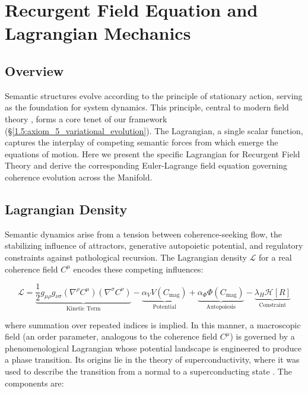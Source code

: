 \chapter{Recurgent Field Equation and Lagrangian Mechanics}
\label{6:recurgent_field_equation_and_lagrangian_mechanics}


\section{Overview}
\label{6.1:overview}

Semantic structures evolve according to the principle of stationary action, serving as the foundation for system dynamics. This principle, central to modern field theory \autocite{GoldsteinPooleSafko2002, Arnold1989}, forms a core tenet of our framework (\S\ref{1.5:axiom_5_variational_evolution}). The Lagrangian, a single scalar function, captures the interplay of competing semantic forces from which emerge the equations of motion. Here we present the specific Lagrangian for Recurgent Field Theory and derive the corresponding Euler-Lagrange field equation governing coherence evolution across the Manifold.


\section{Lagrangian Density}
\label{6.2:lagrangian_density}

Semantic dynamics arise from a tension between coherence-seeking flow, the stabilizing influence of attractors, generative autopoietic potential, and regulatory constraints against pathological recursion. The Lagrangian density \(\mathcal{L}\) for a real coherence field \(C^\mu\) encodes these competing influences:

\begin{equation}
\mathcal{L} = \underbrace{\frac{1}{2} g_{\mu\rho} g_{\nu\sigma} (\nabla^\rho C^\mu)(\nabla^\sigma C^\nu)}_{\text{Kinetic Term}} - \underbrace{\alpha_V V(C_{\text{mag}})}_{\text{Potential}} + \underbrace{\alpha_\Phi \Phi(C_{\text{mag}})}_{\text{Autopoiesis}} - \underbrace{\lambda_H \mathcal{H}[R]}_{\text{Constraint}}
\end{equation}

where summation over repeated indices is implied. In this manner, a macroscopic field (an order parameter, analogous to the coherence field \(C^\mu\)) is governed by a phenomenological Lagrangian whose potential landscape is engineered to produce a phase transition. Its origins lie in the theory of superconductivity, where it was used to describe the transition from a normal to a superconducting state \autocite{GinzburgLandau1950}. The components are:

